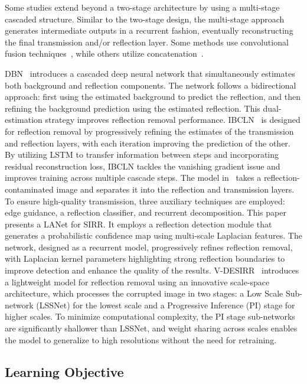 Some studies extend beyond a two-stage architecture by using a multi-stage cascaded structure. Similar to the two-stage design, the multi-stage approach generates intermediate outputs in a recurrent fashion, eventually reconstructing the final transmission and/or reflection layer.
Some methods use convolutional fusion techniques~\cite{prasad2021v}, while others utilize concatenation~\cite{yang2018seeing, li2020single, chang2021single, dong2021location}.

DBN~\cite{yang2018seeing} introduces a cascaded deep neural network that simultaneously estimates both background and reflection components. The network follows a bidirectional approach: first using the estimated background to predict the reflection, and then refining the background prediction using the estimated reflection. This dual-estimation strategy improves reflection removal performance.
IBCLN~\cite{li2020single} is designed for reflection removal by progressively refining the estimates of the transmission and reflection layers, with each iteration improving the prediction of the other. By utilizing LSTM to transfer information between steps and incorporating residual reconstruction loss, IBCLN tackles the vanishing gradient issue and improves training across multiple cascade steps.
The model in~\cite{chang2021single} takes a reflection-contaminated image and separates it into the reflection and transmission layers. To ensure high-quality transmission, three auxiliary techniques are employed: edge guidance, a reflection classifier, and recurrent decomposition.
This paper~\cite{dong2021location} presents a LANet for SIRR. It employs a reflection detection module that generates a probabilistic confidence map using multi-scale Laplacian features. The network, designed as a recurrent model, progressively refines reflection removal, with Laplacian kernel parameters highlighting strong reflection boundaries to improve detection and enhance the quality of the results.
V-DESIRR~\cite{prasad2021v} introduces a lightweight model for reflection removal using an innovative scale-space architecture, which processes the corrupted image in two stages: a Low Scale Sub-network (LSSNet) for the lowest scale and a Progressive Inference (PI) stage for higher scales. To minimize computational complexity, the PI stage sub-networks are significantly shallower than LSSNet, and weight sharing across scales enables the model to generalize to high resolutions without the need for retraining.



\subsection{Learning Objective}
\label{sec:learning-objective}

